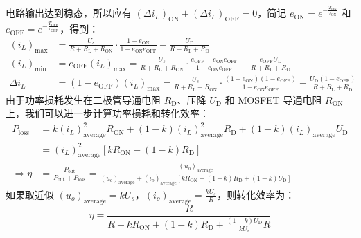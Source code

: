 \documentclass[UTF8]{report}
\theoremstyle{MyLineTheoremStyle} %
\theoremstyle{MyBlockTheoremStyle} %
\theoremstyle{MySubsubsectionStyle} %
\begin{document}
电路输出达到稳态，所以应有 $\left(\Delta i_L\right)_{\text{ON}} + \left(\Delta i_L\right)_{\text{OFF}} = 0$，简记 $e_{\text{ON}} = e^{-\frac{T_{\text{ON}}}{\tau_{\text{ON}}}}$ 和 $e_{\text{OFF}} = e^{-\frac{T_{\text{OFF}}}{\tau_{\text{OFF}}}}$，得到：
\begin{align}
\left(i_L\right)_{\max} &= \frac{U_s}{R + R_{\text{L}} + R_{\text{ON}}}\cdot \frac{1 - e_{\text{ON}}}{1 - e_{\text{ON}}e_{\text{OFF}}} - \frac{U_\text{D}}{R + R_{\text{L}} + R_{\text{D}}}
\\
\left(i_L\right)_{\min} &=  e_{\text{OFF}}\left(i_L\right)_{\max} =  \frac{U_s}{R + R_{\text{L}} + R_{\text{ON}}}\cdot \frac{e_{\text{OFF}} - e_{\text{ON}}e_{\text{OFF}}}{1 - e_{\text{ON}}e_{\text{OFF}}} - \frac{e_{\text{OFF}}U_\text{D}}{R + R_{\text{L}} + R_{\text{D}}}
\\
\Delta i_L &= \left(1  -e_{\text{OFF}}\right)\left(i_L\right)_{\max} = \frac{U_s}{R + R_{\text{L}} + R_{\text{ON}}}\cdot \frac{ (1 - e_{\text{ON}})(1 - e_{\text{OFF}}) }{1 - e_{\text{ON}}e_{\text{OFF}}} - \frac{ U_\text{D}(1 - e_{\text{OFF}})}{R + R_{\text{L}} + R_{\text{D}}}
\end{align}
由于功率损耗发生在二极管导通电阻 $R_{\text{D}}$、压降 $U_\text{D}$ 和 MOSFET 导通电阻 $R_{\text{ON}}$ 上，我们可以进一步计算功率损耗和转化效率：
\begin{align}
P_{\text{loss}} 
&= k\left(i_L\right)_{\text{average}}^2R_{\text{ON}} + (1 - k)\left(i_L\right)_{\text{average}}^2R_{\text{D}}
+ (1 - k)\left(i_L\right)_{\text{average}}U_\text{D} 
\\
&= \left(i_L\right)_{\text{average}}^2 \left[ k R_{\text{ON}} + (1 - k)R_{\text{D}} \right] \\ 
\Longrightarrow \eta &= \frac{P_{\text{out}}}{P_{\text{out}} + P_{\text{loss}} } = \frac{\left(u_o\right)_\text{average}}{\left(u_o\right)_\text{average} + \left(i_o\right)_{\text{average}} \left[ k R_{\text{ON}} + (1 - k)R_{\text{D}} + (1 - k)U_\text{D} \right]}
\end{align}
如果取近似 $\left(u_o\right)_\text{average} = kU_s$，$\left(i_o\right)_{\text{average}} = \frac{kU_s}{R}$，则转化效率为：
\begin{equation}
\eta = \frac{R}{R + kR_{\text{ON}} + (1-k)R_{\text{D}} +  \frac{(1 - k)U_\text{D}}{kU_s} R }
\end{equation}
\end{document}
